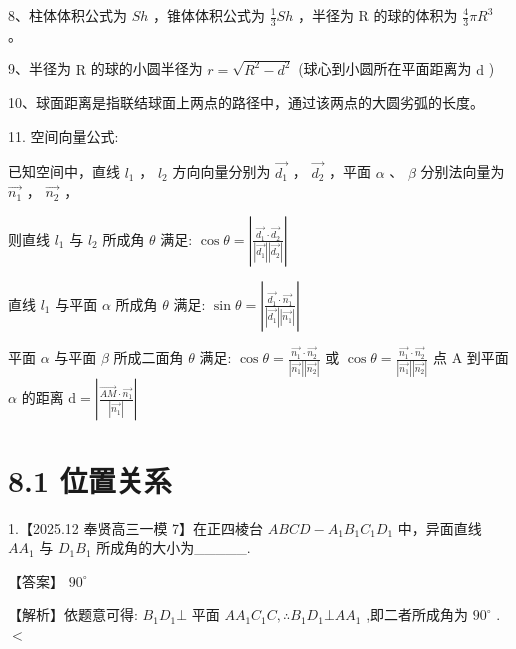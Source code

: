 \documentclass[10pt]{article}
\begin{document}
8、柱体体积公式为 \({Sh}\) ，锥体体积公式为 \(\frac{1}{3}{Sh}\) ，半径为 \(\mathrm{R}\) 的球的体积为 \(\frac{4}{3}\pi {R}^{3}\) 。

9、半径为 \(\mathrm{R}\) 的球的小圆半径为 \(r = \sqrt{{R}^{2} - {d}^{2}}\) (球心到小圆所在平面距离为 \(\mathrm{d}\) )

10、球面距离是指联结球面上两点的路径中，通过该两点的大圆劣弧的长度。

11. 空间向量公式:

已知空间中，直线 \({l}_{1}\) ， \({l}_{2}\) 方向向量分别为 \(\overrightarrow{{d}_{1}}\) ， \(\overrightarrow{{d}_{2}}\) ，平面 \(\alpha\) 、 \(\beta\) 分别法向量为 \(\overrightarrow{{n}_{1}}\) ， \(\overrightarrow{{n}_{2}}\) ，

则直线 \({l}_{1}\) 与 \({l}_{2}\) 所成角 \(\theta\) 满足: \(\cos \theta  = \left| \frac{\overrightarrow{{d}_{1}} \cdot  \overrightarrow{{d}_{2}}}{\left| \overrightarrow{{d}_{1}}\right| \left| \overrightarrow{{d}_{2}}\right| }\right|\)

直线 \({l}_{1}\) 与平面 \(\alpha\) 所成角 \(\theta\) 满足: \(\sin \theta  = \left| \frac{\overrightarrow{{d}_{1}} \cdot  \overrightarrow{{n}_{1}}}{\left| \overrightarrow{{d}_{1}}\right| \left| \overrightarrow{{n}_{1}}\right| }\right|\)

平面 \(\alpha\) 与平面 \(\beta\) 所成二面角 \(\theta\) 满足: \(\cos \theta  = \frac{\overrightarrow{{n}_{1}} \cdot  \overrightarrow{{n}_{2}}}{\left| \overrightarrow{{n}_{1}}\right| \left| \overrightarrow{{n}_{2}}\right| }\) 或 \(\cos \theta  = \frac{\overrightarrow{{n}_{1}} \cdot  \overrightarrow{{n}_{2}}}{\left| \overrightarrow{{n}_{1}}\right| \left| \overrightarrow{{n}_{2}}\right| }\) 点 \(\mathrm{A}\) 到平面 \(\alpha\) 的距离 \(\mathrm{d} = \left| \frac{\overrightarrow{AM} \cdot  \overrightarrow{{n}_{1}}}{\left| \overrightarrow{{n}_{1}}\right| }\right|\)

\section*{8.1 位置关系}

1.【2025.12 奉贤高三一模 7】在正四棱台 \({ABCD} - {A}_{1}{B}_{1}{C}_{1}{D}_{1}\) 中，异面直线 \(A{A}_{1}\) 与 \({D}_{1}{B}_{1}\) 所成角的大小为\_\_\_\_\_.

【答案】 \({90}^{ \circ  }\)

【解析】依题意可得: \({B}_{1}{D}_{1} \bot\) 平面 \(A{A}_{1}{C}_{1}C,\therefore {B}_{1}{D}_{1} \bot  A{A}_{1}\) ,即二者所成角为 \({90}^{ \circ  }\) . \(<\)
\end{document}
